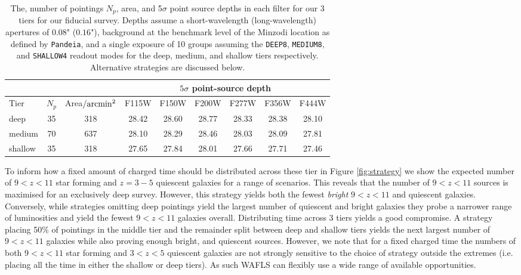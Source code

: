 \documentclass[12pt]{article}
\begin{document}
\begin{table}[h!]
\begin{center}
\begin{tabular}{ |l|c|c|c|c|c|c|c|c| } 
\hline
\multicolumn{3}{|c|}{} & \multicolumn{6}{|c|}{$5\sigma$ point-source depth} \\
 \hline
Tier & $N_{p}$ & Area$/{\rm arcmin^2}$ & F115W & F150W & F200W & F277W & F356W & F444W \\
\hline
deep & 35 & 318 & 28.42 & 28.60 & 28.77 & 28.33 & 28.38 & 28.10 \\
medium & 70 & 637 & 28.10 & 28.29 & 28.46 & 28.03 & 28.09 & 27.81 \\
shallow & 35 & 318 & 27.65 & 27.84 & 28.01 & 27.66 & 27.71 & 27.46 \\
\hline
\end{tabular}
\end{center}
\vspace{-5mm}
\caption{The, number of pointings $N_p$, area, and 5$\sigma$ point source depths in each filter for our 3 tiers for our fiducial survey.  Depths assume a short-wavelength (long-wavelength) apertures of $0.08$" ($0.16$"), background at the benchmark level of the Minzodi location as defined by \texttt{Pandeia}, and a single exposure of 10 groups assuming the \texttt{DEEP8}, \texttt{MEDIUM8}, and \texttt{SHALLOW4} readout modes for the deep, medium, and shallow tiers respectively. Alternative strategies are discussed below.}
\end{table}

To inform how a fixed amount of charged time should be distributed across these tier in Figure \ref{fig:strategy} we show the expected number of $9<z<11$ star forming and $z=3-5$ quiescent galaxies for a range of scenarios. This reveals that the number of $9<z<11$ sources is maximised for an exclusively deep survey. However, this strategy yields both the fewest \emph{bright} $9<z<11$ and quiescent galaxies. Conversely, while strategies omitting deep pointings yield the largest number of quiescent and bright galaxies they probe a narrower range of luminosities and yield the fewest $9<z<11$ galaxies overall. Distributing time across 3 tiers yields a good compromise. A strategy placing 50\% of pointings in the middle tier and the remainder split between deep and shallow tiers yields the next largest number of $9<z<11$ galaxies while also proving enough bright, and quiescent sources. However, we note that for a fixed charged time the numbers of both $9<z<11$ star forming and $3<z<5$ quiescent galaxies are not strongly sensitive to the choice of strategy outside the extremes (i.e. placing all the time in either the shallow or deep tiers). As such WAFLS can flexibly use a wide range of available opportunities.
\end{document}
